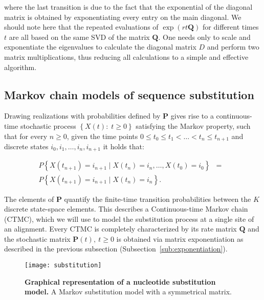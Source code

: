 \noindent 
where the last transition is due to the fact that the exponential of the diagonal matrix is obtained by exponentiating every entry on the main diagonal.
We should note here that the repeated evaluations of $\exp\left(rt\mathbf{Q}\right)$ for different times $t$ are all based on the same SVD of the matrix $\mathbf{Q}$. 
One needs only to scale and exponentiate the eigenvalues to calculate the diagonal matrix $D$ and perform two matrix multiplications, thus reducing all calculations to a simple and effective algorithm. 

\subsection{Markov chain models of sequence substitution\label{sub:subst_models}}

Drawing realizations with probabilities defined by $\mathbf{P}$  gives rise to a continuous-time stochastic process $\left\{ X(t):\; t\geq0\right\}$ satisfying the Markov property, such that for every $n\geq 0$, given the time points $0\leq t_{0}\leq t_{1}<\ldots<t_{n}\leq t_{n+1}$ and discrete states $i_{0},i_{1}, \ldots, i_{n},i_{n+1}$ it holds that: 

\begin{eqnarray}
P\left\{ X(t_{n+1})=i_{n+1}\mid X(t_{n})=i_{n},\ldots, X(t_{0})=i_{0}\right\} & = & \\ \nonumber
P\left\{ X(t_{n+1})=i_{n+1}\mid X(t_{n})=i_{n}\right\} .
\label{eq:markov}
\end{eqnarray}

The elements of $\mathbf{P}$ quantify the finite-time transition probabilities between the $K$ discrete state-space elements.
This describes a Continuous-time Markov chain (CTMC), which  we will use to model the substitution process at a single site of an alignment.
Every CTMC is completely characterized by its rate matrix $\mathbf{Q}$ and the stochastic matrix $\mathbf{P}(t),\ t\geq0$ is obtained via matrix exponentiation as described in the previous subsection (Subsection~\ref{sub:exponentiation}).

\begin{figure}[H]
\centering
\texttt{[image: substitution]} 
\caption{
{ \footnotesize 
{\bf  Graphical representation of  a nucleotide substitution model.} A Markov substitution model with a symmetrical matrix.
} %
}
\label{fig:substitution}
\end{figure}

